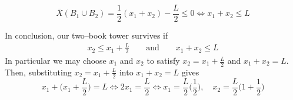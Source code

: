 \begin{itemize}
\begin{itemize}
\begin{equation*}
\bar X(B_1\cup B_2)
=\frac{1}{2}(x_1+x_2) -\frac{L}{2} \le 0
\iff
x_1+x_2\le L
\end{equation*}
\end{itemize}
In conclusion, our two--book tower survives if
\begin{align*}
x_2\le x_1+\frac{L}{2}\qquad\text{and}\qquad x_1+x_2\le L
\end{align*}
In particular we may choose $x_1$ and $x_2$ to satisfy
$x_2 = x_1+\frac{L}{2}$ and $x_1+x_2 = L$. Then, substituting
$x_2 = x_1+\frac{L}{2}$ into $x_1+x_2 = L$ gives
\begin{equation*}
x_1 + \Big(x_1+\frac{L}{2}\Big) = L
\iff 2x_1 = \frac{L}{2}
\iff x_1 = \frac{L}{2}\Big(\frac{1}{2}\Big),\quad
     x_2 = \frac{L}{2}\Big(1+\frac{1}{2}\Big)
\end{equation*}


\end{itemize}
